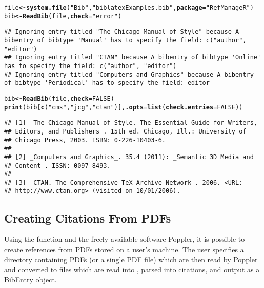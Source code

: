 \documentclass[article]{jss}\usepackage[]{graphicx}\usepackage[]{color}
\makeatletter
\newcommand{\hlnum}[1]{\textcolor[rgb]{0.125,0.125,1}{#1}}%
\newcommand{\hlstr}[1]{\textcolor[rgb]{0.125,0.125,1}{#1}}%
\newcommand{\hlstd}[1]{\textcolor[rgb]{0.251,0.251,0.282}{#1}}%
\newcommand{\hlkwb}[1]{\textcolor[rgb]{0.439,0.251,1}{\textbf{#1}}}%
\newcommand{\hlkwc}[1]{\textcolor[rgb]{0.529,0,0.184}{\textbf{#1}}}%
\newcommand{\hlkwd}[1]{\textcolor[rgb]{0.251,0.251,0.282}{\textbf{#1}}}%
\newenvironment{kframe}{%
 \def\at@end@of@kframe{}%
 \ifinner\ifhmode%
  \def\at@end@of@kframe{\end{minipage}}%
  \begin{minipage}{\columnwidth}%
 \fi\fi%
 \def\FrameCommand##1{\hskip\@totalleftmargin \hskip-\fboxsep
 \colorbox{shadecolor}{##1}\hskip-\fboxsep
     \hskip-\linewidth \hskip-\@totalleftmargin \hskip\columnwidth}%
 \MakeFramed {\advance\hsize-\width
   \@totalleftmargin\z@ \linewidth\hsize
   \@setminipage}}%
 {\par\unskip\endMakeFramed%
 \at@end@of@kframe}
\newenvironment{knitrout}{}{} %
\makeatother
\begin{document}
\begin{knitrout}
\color{fgcolor}\begin{kframe}
\begin{alltt}
\hlstd{file} \hlkwb{<-} \hlkwd{system.file}\hlstd{(}\hlstr{"Bib"}\hlstd{,} \hlstr{"biblatexExamples.bib"}\hlstd{,} \hlkwc{package} \hlstd{=} \hlstr{"RefManageR"}\hlstd{)}
\hlstd{bib} \hlkwb{<-} \hlkwd{ReadBib}\hlstd{(file,} \hlkwc{check} \hlstd{=} \hlstr{"error"}\hlstd{)}
\end{alltt}
\begin{lstlisting}
## Ignoring entry titled "The Chicago Manual of Style" because A bibentry of bibtype 'Manual' has to specify the field: c("author", "editor")
## Ignoring entry titled "CTAN" because A bibentry of bibtype 'Online' has to specify the field: c("author", "editor")
## Ignoring entry titled "Computers and Graphics" because A bibentry of bibtype 'Periodical' has to specify the field: editor
\end{lstlisting}\begin{alltt}
\hlstd{bib} \hlkwb{<-} \hlkwd{ReadBib}\hlstd{(file,} \hlkwc{check} \hlstd{=} \hlnum{FALSE}\hlstd{)}
\hlkwd{print}\hlstd{(bib[}\hlkwd{c}\hlstd{(}\hlstr{"cms"}\hlstd{,} \hlstr{"jcg"}\hlstd{,} \hlstr{"ctan"}\hlstd{)],} \hlkwc{.opts} \hlstd{=} \hlkwd{list}\hlstd{(}\hlkwc{check.entries} \hlstd{=} \hlnum{FALSE}\hlstd{))}
\end{alltt}
\begin{verbatim}
## [1] _The Chicago Manual of Style. The Essential Guide for Writers,
## Editors, and Publishers_. 15th ed. Chicago, Ill.: University of
## Chicago Press, 2003. ISBN: 0-226-10403-6.
## 
## [2] _Computers and Graphics_. 35.4 (2011): _Semantic 3D Media and
## Content_. ISSN: 0097-8493.
## 
## [3] _CTAN. The Comprehensive TeX Archive Network_. 2006. <URL:
## http://www.ctan.org> (visited on 10/01/2006).
\end{verbatim}
\end{kframe}
\end{knitrout}


\subsection{Creating Citations From PDFs}
Using the function  and the freely available software Poppler, it is possible to create references from PDFs stored on a user's machine.  The user specifies a directory containing PDFs (or a single PDF file) which are then read by Poppler and converted to  files which are read into \R{}, parsed into citations, and output as a BibEntry object.  
\end{document}
